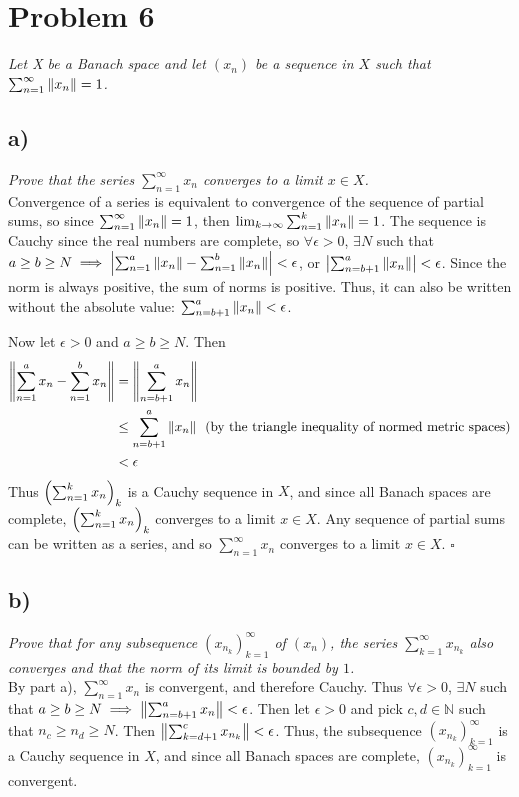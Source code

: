 \documentclass[12pt]{article}
\begin{document}
\section*{Problem 6}
{\it Let X be a Banach space and let $(x_n)$ be a sequence in $X$ such that $\sum_{n=1}^\infty \norm{x_n} = 1$.}

\subsection*{ a)}
{\it Prove that the series $\sum_{n=1}^\infty x_n$ converges to a limit $x \in X$.} \\

Convergence of a series is equivalent to convergence of the sequence of partial sums, so since $\sum_{n=1}^\infty \norm{x_n} = 1$, then $\lim_{k\rightarrow\infty}\sum_{n=1}^k \norm{x_n} = 1$.  The sequence is Cauchy since the real numbers are complete, so $\forall\epsilon>0$, $\exists N$ such that $a \geq b \geq N \implies \left|\sum_{n=1}^a \norm{x_n} - \sum_{n=1}^b \norm{x_n}\right| < \epsilon$, or $\left|\sum_{n=b+1}^a \norm{x_n}\right| < \epsilon$.  Since the norm is always positive, the sum of norms is positive.  Thus, it can also be written without the absolute value: $\sum_{n=b+1}^a \norm{x_n} < \epsilon$.

Now let $\epsilon > 0$ and $a \geq b \geq N$.  Then
\begin{align*}
	\norm{\sum_{n=1}^{a} x_n - \sum_{n=1}^{b} x_n} &= \norm{\sum_{n=b+1}^a x_n} \\
	&\leq \sum_{n=b+1}^a \norm{x_n}\ \ \text{(by the triangle inequality of normed metric spaces)} \\
	&< \epsilon
\end{align*}
Thus $\qty(\sum_{n=1}^k x_n)_k$ is a Cauchy sequence in $X$, and since all Banach spaces are complete, $\qty(\sum_{n=1}^k x_n)_k$ converges to a limit $x \in X$.  Any sequence of partial sums can be written as a series, and so $\sum_{n=1}^\infty x_n$ converges to a limit $x \in X$. \hfill $\square$

\subsection*{ b)}
{\it Prove that for any subsequence $(x_{n_k})_{k=1}^\infty$ of $(x_n)$, the series $\sum_{k=1}^\infty x_{n_k}$ also converges and that the norm of its limit is bounded by $1$.} \\

By part a), $\sum_{n=1}^\infty x_n$ is convergent, and therefore Cauchy.  Thus $\forall\epsilon>0$, $\exists N$ such that $a \geq b \geq N \implies \norm{\sum_{n=b+1}^{a} x_n} < \epsilon$.  Then let $\epsilon>0$ and pick $c,d\in\mathbb{N}$ such that $n_c \geq n_d \geq N$.  Then $\norm{\sum_{k=d+1}^{c} x_{n_k}} < \epsilon$.  Thus, the subsequence $(x_{n_k})_{k=1}^\infty$ is a Cauchy sequence in $X$, and since all Banach spaces are complete, $(x_{n_k})_{k=1}^\infty$ is convergent.
\end{document}
